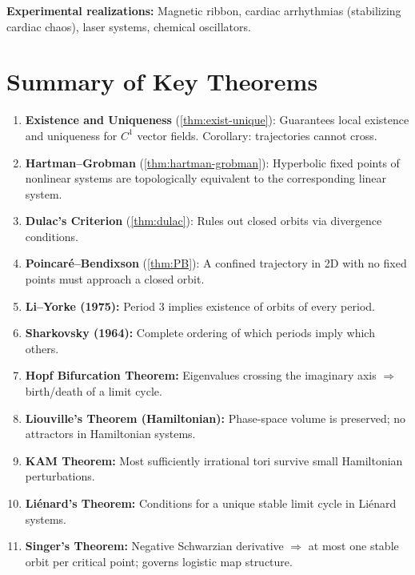 \documentclass[11pt,letterpaper]{article}
\theoremstyle{definition}
\theoremstyle{plain}
\theoremstyle{remark}
\begin{document}
\textbf{Experimental realizations:}
Magnetic ribbon, cardiac arrhythmias (stabilizing cardiac chaos),
laser systems, chemical oscillators.

\appendix

\section{Summary of Key Theorems}\label{app:theorems}

\begin{enumerate}[leftmargin=2em]
\item \textbf{Existence and Uniqueness} (\ref{thm:exist-unique}):
      Guarantees local existence and uniqueness for $C^1$ vector fields.
      Corollary: trajectories cannot cross.
\item \textbf{Hartman--Grobman} (\ref{thm:hartman-grobman}):
      Hyperbolic fixed points of nonlinear systems are topologically
      equivalent to the corresponding linear system.
\item \textbf{Dulac's Criterion} (\ref{thm:dulac}):
      Rules out closed orbits via divergence conditions.
\item \textbf{Poincar\'e--Bendixson} (\ref{thm:PB}):
      A confined trajectory in 2D with no fixed points must approach
      a closed orbit.
\item \textbf{Li--Yorke (1975):}
      Period 3 implies existence of orbits of every period.
\item \textbf{Sharkovsky (1964):}
      Complete ordering of which periods imply which others.
\item \textbf{Hopf Bifurcation Theorem:}
      Eigenvalues crossing the imaginary axis $\Rightarrow$
      birth/death of a limit cycle.
\item \textbf{Liouville's Theorem (Hamiltonian):}
      Phase-space volume is preserved; no attractors in Hamiltonian systems.
\item \textbf{KAM Theorem:}
      Most sufficiently irrational tori survive small Hamiltonian perturbations.
\item \textbf{Li\'enard's Theorem:}
      Conditions for a unique stable limit cycle in Li\'enard systems.
\item \textbf{Singer's Theorem:}
      Negative Schwarzian derivative $\Rightarrow$ at most one stable
      orbit per critical point; governs logistic map structure.
\end{enumerate}
\end{document}
